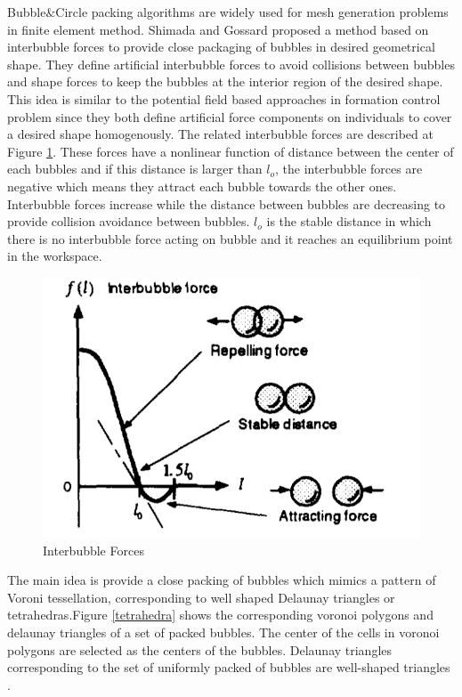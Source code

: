 Bubble$\&$Circle packing algorithms are widely used for mesh generation problems in finite element method. Shimada and Gossard \cite{27} proposed a method based on interbubble forces to provide close packaging of bubbles in desired geometrical shape. They define artificial interbubble forces to avoid collisions between bubbles and shape forces to keep the bubbles at the interior region of the desired shape. This idea is similar to the potential field based approaches in formation control problem since they both define artificial force components on individuals to cover a desired shape homogenously. The related interbubble forces are described at Figure \ref{interbubble_ref}. These forces have a nonlinear function of distance between the center of each bubbles and if this distance is larger than $l_o$, the interbubble forces are negative which means they attract each bubble towards the other ones. Interbubble forces increase while the distance between bubbles are decreasing to provide collision avoidance between bubbles. $l_o$ is the stable distance in which there is no interbubble force acting on bubble and it reaches an equilibrium point in the workspace.

\begin{figure}[H]
	\caption{Interbubble Forces \cite{27}} \label{interbubble_ref}
	\centering
	\includegraphics[scale = 0.3]{interbubble}
\end{figure}

The main idea is provide a close packing of bubbles which mimics a pattern of Voroni tessellation, corresponding to well shaped Delaunay triangles or tetrahedras.Figure \ref{tetrahedra} shows the corresponding voronoi polygons and delaunay triangles of a set of packed bubbles. The center of the cells in voronoi polygons are selected as the centers of the bubbles. Delaunay triangles corresponding to the set of uniformly packed of bubbles are well-shaped triangles \cite{27}. 

